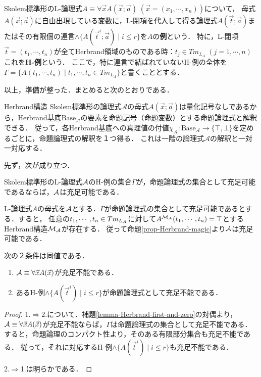 \documentclass[uplatex, dvipdfmx]{jsreport}
\begin{document}
\begin{definition}[H-instance]
    Skolem標準形のL-論理式$A\equiv \forall\vec{x}A(\vec{x};\vec{a})\;(\vec{x}=(x_1,\cdots,x_n))$について，
    母式$A(\vec{x};\vec{a})$に自由出現している変数に，L-閉項を代入して得る論理式$A(\vec{t};\vec{a})$またはその有限個の連言$\land\{A(\vec{t}^i;\vec{a})\mid i\le r\}$を$A$の\textbf{例}という．
    特に，L-閉項$\vec{t}=(t_1,\cdots,t_n)$が全てHerbrand領域のものである時：$t_j\in Tm_{L_A}\;(j=1,\cdots,n)$これを\textbf{H-例}という．
    ここで，特に連言で結ばれていないH-例の全体を$\Gamma=\{A(t_1,\cdots,t_n)\mid t_1,\cdots,t_n\in Tm_{L_A}\}$と書くこととする．
\end{definition}

以上，準備が整った．まとめると次のとおりである．
\begin{itembox}[l]{Herbrand構造}
    Skolem標準形の論理式$\mathcal{A}$の母式$A(\vec{x};\vec{a})$は量化記号なしであるから，Herbrand基底$\mathrm{Base}_\mathcal{A}$の要素を命題記号（命題変数）とする命題論理式と解釈できる．
    従って，各Herbrand基底への真理値の付値$\chi_\mathcal{A}:\mathrm{Base}_\mathcal{A}\to\{\top,\bot\}$を定めるごとに，命題論理式の解釈を１つ得る．
    これは一階の論理式$\mathcal{A}$の解釈と一対一対応する．
\end{itembox}

先ず，次が成り立つ．
\begin{lemma}\label{lemma-Herbrand-first-and-zero}
    Skolem標準形のL-論理式$\mathcal{A}$のH-例の集合$\Gamma$が，命題論理式の集合として充足可能であるならば，$\mathcal{A}$は充足可能である．
\end{lemma}
\begin{remark}
    L-論理式$A$の母式を$\mathcal{A}$とする．$\Gamma$が命題論理式の集合として充足可能であるとする．すると，
    任意の$t_1,\cdots,t_n\in Tm_{L_{\mathcal{A}}}$に対して$A^{\mathcal{M}_{\mathcal{A}}}(t_1,\cdots,t_n)=\top$とするHerbrand構造$\mathcal{M}_{\mathcal{A}}$が存在する．
    従って命題\ref{prop-Herbrand-magic}より$\mathcal{A}$は充足可能である．
\end{remark}

\begin{theorem}
    次の２条件は同値である．
    \begin{enumerate}
        \item $\mathcal{A}\equiv\forall\vec{x}A(\vec{x})$が充足不能である．
        \item あるH-例$\land\{A(\vec{t}^i)\mid i\le r\}$が命題論理式として充足不能である．
    \end{enumerate}
\end{theorem}
\begin{proof}
    1.$\Rightarrow$2.について．補題\ref{lemma-Herbrand-first-and-zero}の対偶より，
    $\mathcal{A}\equiv\forall\vec{x}A(\vec{x})$が充足不能ならば，$\Gamma$は命題論理式の集合として充足不能である．
    すると，命題論理のコンパクト性より，そのある有限部分集合も充足不能である．
    従って，それに対応するH-例$\land\{A(\vec{t}^i)\mid i\le r\}$も充足不能である．

    2.$\Rightarrow$1.は明らかである．
\end{proof}
\end{document}
